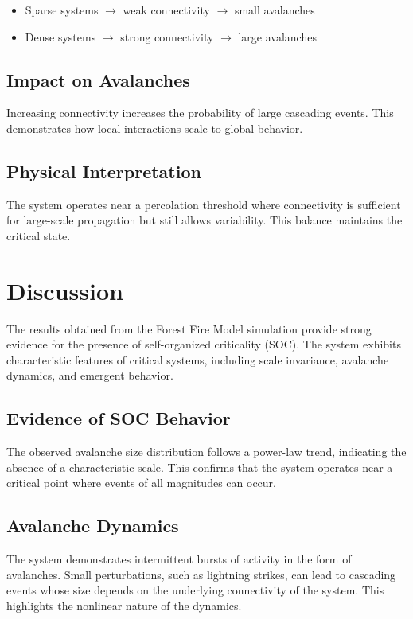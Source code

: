 \documentclass[12pt,a4paper]{article}
\begin{document}
\begin{itemize}
\item Sparse systems $\rightarrow$ weak connectivity $\rightarrow$ small avalanches
\item Dense systems $\rightarrow$ strong connectivity $\rightarrow$ large avalanches
\end{itemize}

\subsection{Impact on Avalanches}

Increasing connectivity increases the probability of large cascading events. This demonstrates how local interactions scale to global behavior.

\subsection{Physical Interpretation}

The system operates near a percolation threshold where connectivity is sufficient for large-scale propagation but still allows variability. This balance maintains the critical state.
\section{Discussion}

The results obtained from the Forest Fire Model simulation provide strong evidence for the presence of self-organized criticality (SOC). The system exhibits characteristic features of critical systems, including scale invariance, avalanche dynamics, and emergent behavior.

\subsection{Evidence of SOC Behavior}

The observed avalanche size distribution follows a power-law trend, indicating the absence of a characteristic scale. This confirms that the system operates near a critical point where events of all magnitudes can occur.

\subsection{Avalanche Dynamics}

The system demonstrates intermittent bursts of activity in the form of avalanches. Small perturbations, such as lightning strikes, can lead to cascading events whose size depends on the underlying connectivity of the system. This highlights the nonlinear nature of the dynamics.
\end{document}
